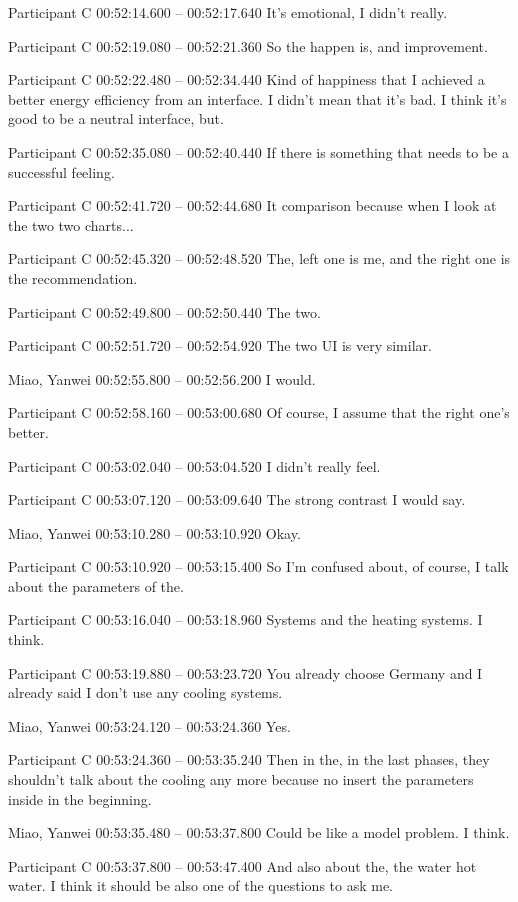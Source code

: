 {Participant C 00:52:14.600 -- 00:52:17.640
It's emotional, I didn't really.

Participant C 00:52:19.080 -- 00:52:21.360
So the happen is, and improvement.

Participant C 00:52:22.480 -- 00:52:34.440
Kind of happiness that I achieved a better energy efficiency from an interface. I didn't mean that it's bad. I think it's good to be a neutral interface, but.

Participant C 00:52:35.080 -- 00:52:40.440
If there is something that needs to be a successful feeling.

Participant C 00:52:41.720 -- 00:52:44.680
It comparison because when I look at the two two charts...

Participant C 00:52:45.320 -- 00:52:48.520
The, left one is me, and the right one is the recommendation.

Participant C 00:52:49.800 -- 00:52:50.440
The two.

Participant C 00:52:51.720 -- 00:52:54.920
The two UI is very similar.

Miao, Yanwei 00:52:55.800 -- 00:52:56.200
I would.

Participant C 00:52:58.160 -- 00:53:00.680
Of course, I assume that the right one's better.

Participant C 00:53:02.040 -- 00:53:04.520
I didn't really feel.

Participant C 00:53:07.120 -- 00:53:09.640
The strong contrast I would say.

Miao, Yanwei 00:53:10.280 -- 00:53:10.920
Okay.

Participant C 00:53:10.920 -- 00:53:15.400
So I'm confused about, of course, I talk about the parameters of the.

Participant C 00:53:16.040 -- 00:53:18.960
Systems and the heating systems. I think.

Participant C 00:53:19.880 -- 00:53:23.720
You already choose Germany and I already said I don't use any cooling systems.

Miao, Yanwei 00:53:24.120 -- 00:53:24.360
Yes.

Participant C 00:53:24.360 -- 00:53:35.240
Then in the, in the last phases, they shouldn't talk about the cooling any more because no insert the parameters inside in the beginning.

Miao, Yanwei 00:53:35.480 -- 00:53:37.800
Could be like a model problem. I think.

Participant C 00:53:37.800 -- 00:53:47.400
And also about the, the water hot water. I think it should be also one of the questions to ask me.

}
